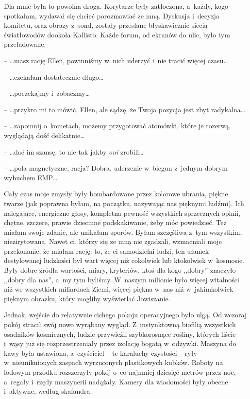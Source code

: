 \documentclass[oneside,polish,11pt,sfheadings]{mwbk}
\begin{document}
Dla mnie była to powolna droga. Korytarze były zatłoczona, a~każdy, kogo
spotkałam, wydawał się chcieć porozmawiać ze mną. Dyskusja i~decyzja
komitetu, oraz obrazy z~sond, zostały przesłane błyskawicznie siecią
światłowodów dookoła Kallisto. Każde forum, od ekranów do ulic, było tym
przeładowane.

-- \ldots  masz rację Ellen, powinniśmy w~nich uderzyć i~nie tracić więcej
czasu\ldots 

-- \ldots  czekałam dostatecznie długo\ldots 

-- \ldots  poczekajmy i~zobaczmy\ldots 

-- \ldots  przykro mi to mówić, Ellen, ale sądzę, że Twoja pozycja jest zbyt
radykalna\ldots 

-- \ldots  zapomnij o~kometach, możemy przygotować atomówki, które je
rozerwą, wyglądają dość delikatnie\ldots 

-- \ldots  dać im szansę, to nie tak jakby \textit{oni }zrobili\ldots 

-- \ldots  pola magnetyczne, racja? Dobra, uderzenie w~biegun z~jednym dobrym
wybuchem EMP\ldots 

Cały czas moje zmysły były bombardowane przez kolorowe ubrania, piękne
twarze (jak poprawna byłam, na początku, nazywając nas pięknymi ludźmi).
Ich nalegające, energiczne głosy, kompletna pewność wszystkich
sprzecznych opinii, chętne, szczere, prawie dziecinne podskakiwanie,
żeby móc powiedzieć. Też miałam swoje zdanie, ale unikałam sporów. Byłam
szczęśliwa z~tym wszystkim, niezirytowana. Nawet ci, którzy się ze mną
nie zgadzali, wzmacniali moje przekonanie, że miałam rację: to, że ci
samodzielni ludzi, ten ułamek destylowanej ludzkości był wart więcej niż
cokolwiek lub ktokolwiek w~kosmosie. Były dobre źródła wartości, miary,
kryteriów, ktoś dla kogo ,,dobry'' znaczyło ,,dobry dla nas'', a~my tym
byliśmy. W~naszym milionie było więcej witalności niż we wszystkich
miliardach Ziemi, więcej piękna w~nas niż w~jakimkolwiek pięknym
obrazku, który mogliby wyświetlać Jowiszanie.

Jednak, wejście do relatywnie cichego pokoju operacyjnego było ulgą. Od
wczoraj pokój stracił swój nowo wyrąbany wygląd. Z~instynktowną biofilią
wszystkich osadników kosmicznych, ludzie przywieźli szybkorosnące
rośliny, których liście i~wąsy już się rozprzestrzeniały przez izolację
bogatą w~odżywki. Maszyna do kawy była ustawiona, a~czyściciel -- te
karaluchy czystości -- ryły w~nieuniknionych zaspach wyrzuconych
plastikowych kubków. Roboty na lodowym przodku rozszerzyły pokój o~co
najmniej dziesięć metrów przez noc, a~regały i~rzędy maszynerii
nadążały. Kamery dla wiadomości były obecne i~aktywne, według skafandra.
\end{document}
